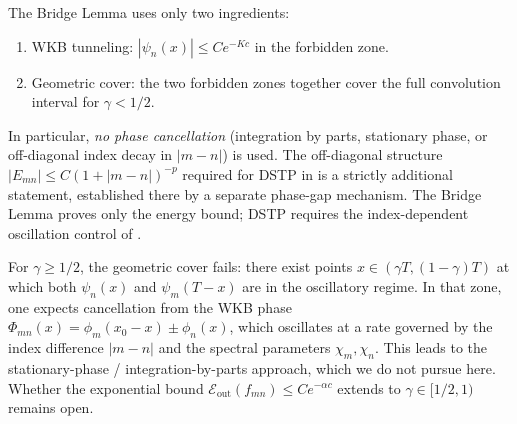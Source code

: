 \begin{remark}
\label{rem:bridge:separation}
The Bridge Lemma uses only two ingredients:
\begin{enumerate}
\item[(i)] WKB tunneling: $|\psi_n(x)| \le C e^{-Kc}$ in the
  forbidden zone.
\item[(ii)] Geometric cover: the two forbidden zones together
  cover the full convolution interval for $\gamma < 1/2$.
\end{enumerate}
In particular, \emph{no phase cancellation} (integration by
parts, stationary phase, or off-diagonal index decay in $|m-n|$)
is used.
The off-diagonal structure $|E_{mn}| \le C(1+|m-n|)^{-p}$
required for DSTP in \cite{PaperI} is a strictly additional
statement, established there by a separate phase-gap mechanism.
The Bridge Lemma proves only the energy bound; DSTP requires the
index-dependent oscillation control of \cite{PaperI}.
\end{remark}

\begin{remark}
\label{rem:bridge:extension}
For $\gamma \ge 1/2$, the geometric cover fails: there exist
points $x \in (\gamma T, (1-\gamma)T)$ at which both
$\psi_n(x)$ and $\psi_m(T-x)$ are in the oscillatory regime.
In that zone, one expects cancellation from the WKB phase
$\Phi_{mn}(x) = \phi_m(x_0 - x) \pm \phi_n(x)$, which oscillates
at a rate governed by the index difference $|m-n|$ and the
spectral parameters $\chi_m, \chi_n$.
This leads to the stationary-phase / integration-by-parts
approach, which we do not pursue here.
Whether the exponential bound
$\mathcal{E}_{\mathrm{out}}(f_{mn}) \le C e^{-\alpha c}$
extends to $\gamma \in [1/2, 1)$ remains open.
\end{remark}
